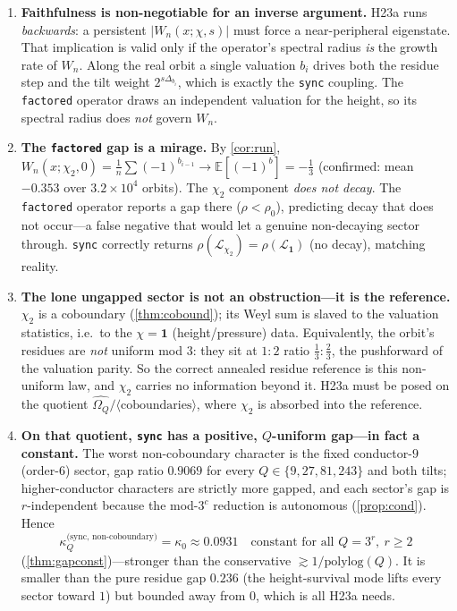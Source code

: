 \documentclass[11pt]{article}
\newcommand{\E}{\mathbb{E}}
\newcommand{\Lcal}{\mathcal{L}}
\newcommand{\Om}{\Omega}
\theoremstyle{plain}
\theoremstyle{remark}
\begin{document}
\begin{enumerate}[leftmargin=1.6em]
\item \textbf{Faithfulness is non-negotiable for an inverse argument.} H23a runs
\emph{backwards}: a persistent $|W_n(x;\chi,s)|$ must force a near-peripheral
eigenstate. That implication is valid only if the operator's spectral radius
\emph{is} the growth rate of $W_n$. Along the real orbit a single valuation
$b_i$ drives both the residue step and the tilt weight $2^{s\Delta_{b_i}}$, which
is exactly the \texttt{sync} coupling. The \texttt{factored} operator draws an
independent valuation for the height, so its spectral radius does \emph{not}
govern $W_n$.

\item \textbf{The \texttt{factored} gap is a mirage.} By \cref{cor:run},
$W_n(x;\chi_2,0)=\frac1n\sum(-1)^{b_{i-1}}\to \E[(-1)^b]=-\tfrac13$ (confirmed:
mean $-0.353$ over $3.2\times10^4$ orbits). The $\chi_2$ component \emph{does not
decay}. The \texttt{factored} operator reports a gap there ($\rho<\rho_0$),
predicting decay that does not occur---a false negative that would let a genuine
non-decaying sector through. \texttt{sync} correctly returns
$\rho(\Lcal_{\chi_2})=\rho(\Lcal_{\mathbf1})$ (no decay), matching reality.

\item \textbf{The lone ungapped sector is not an obstruction---it is the
reference.} $\chi_2$ is a coboundary (\cref{thm:cobound}); its Weyl sum is
slaved to the valuation statistics, i.e.\ to the $\chi=\mathbf1$ (height/pressure)
data. Equivalently, the orbit's residues are \emph{not} uniform mod $3$: they sit
at $1:2$ ratio $\tfrac13:\tfrac23$, the pushforward of the valuation parity. So
the correct annealed residue reference is this non-uniform law, and $\chi_2$
carries no information beyond it. H23a must be posed on the quotient
$\widehat{\Om_Q}/\langle\text{coboundaries}\rangle$, where $\chi_2$ is absorbed
into the reference.

\item \textbf{On that quotient, \texttt{sync} has a positive, $Q$-uniform gap---in
fact a constant.} The worst non-coboundary character is the fixed conductor-$9$
(order-$6$) sector, gap ratio $0.9069$ for every $Q\in\{9,27,81,243\}$ and both
tilts; higher-conductor characters are strictly more gapped, and each sector's gap
is $r$-independent because the mod-$3^c$ reduction is autonomous
(\cref{prop:cond}). Hence
\[
\kappa_Q^{\text{(sync, non-coboundary)}}=\kappa_0\approx0.0931
\quad\text{constant for all }Q=3^r,\ r\ge2
\]
(\cref{thm:gapconst})---stronger than the conservative $\gtrsim1/\mathrm{polylog}(Q)$.
It is smaller than the pure residue gap $0.236$ (the height-survival mode lifts
every sector toward $1$) but bounded away from $0$, which is all H23a needs.
\end{enumerate}
\end{document}

